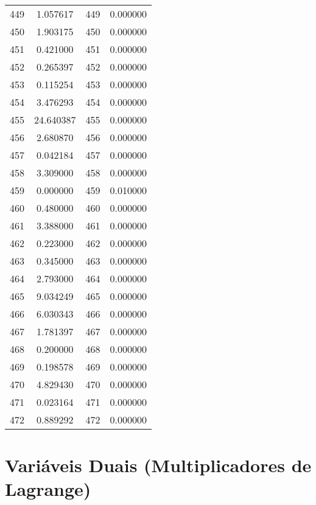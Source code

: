 \documentclass[12pt]{article}
\begin{document}
\begin{longtable}{@{}cccc@{}}
449 & 1.057617 & 449 & 0.000000 \\
450 & 1.903175 & 450 & 0.000000 \\
451 & 0.421000 & 451 & 0.000000 \\
452 & 0.265397 & 452 & 0.000000 \\
453 & 0.115254 & 453 & 0.000000 \\
454 & 3.476293 & 454 & 0.000000 \\
455 & 24.640387 & 455 & 0.000000 \\
456 & 2.680870 & 456 & 0.000000 \\
457 & 0.042184 & 457 & 0.000000 \\
458 & 3.309000 & 458 & 0.000000 \\
459 & 0.000000 & 459 & 0.010000 \\
460 & 0.480000 & 460 & 0.000000 \\
461 & 3.388000 & 461 & 0.000000 \\
462 & 0.223000 & 462 & 0.000000 \\
463 & 0.345000 & 463 & 0.000000 \\
464 & 2.793000 & 464 & 0.000000 \\
465 & 9.034249 & 465 & 0.000000 \\
466 & 6.030343 & 466 & 0.000000 \\
467 & 1.781397 & 467 & 0.000000 \\
468 & 0.200000 & 468 & 0.000000 \\
469 & 0.198578 & 469 & 0.000000 \\
470 & 4.829430 & 470 & 0.000000 \\
471 & 0.023164 & 471 & 0.000000 \\
472 & 0.889292 & 472 & 0.000000 \\

\end{longtable}

\section{Variáveis Duais (Multiplicadores de Lagrange)}
\end{document}
